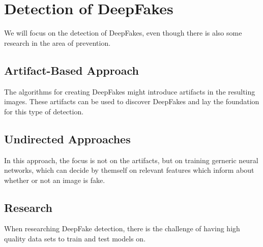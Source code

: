 \section{Detection of DeepFakes}
We will focus on the detection of DeepFakes, even though there is also some research in the area of
prevention.

\subsection{Artifact-Based Approach}
The algorithms for creating DeepFakes might introduce artifacts in the resulting images.
These artifacts can be used to discover DeepFakes and lay the foundation for this type of detection.

\subsection{Undirected Approaches}
In this approach, the focus is not on the artifacts, but on training gerneric neural networks, which can decide by themself on relevant
features which inform about whether or not an image is fake.

\subsection{Research}
When researching DeepFake detection, there is the challenge of having high quality data sets to train and test models on\cite{li_celeb-df_2019}.

